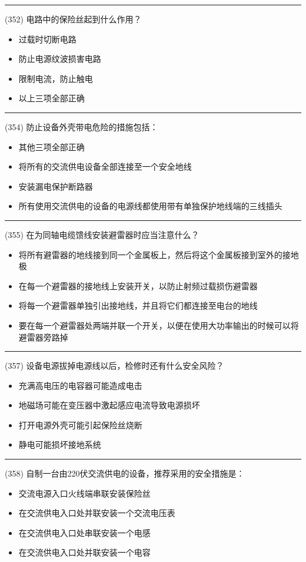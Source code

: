 \documentclass[twocolumn,hyperref,UTF8]{ctexart}  %
\begin{document}
\noindent\rule{0.5\textwidth}{1pt}
\heiti (352) 电路中的保险丝起到什么作用？ \songti {\color{gray} [LK1225] }
\begin{itemize}
	\item  过载时切断电路
	\item  防止电源纹波损害电路
	\item  限制电流，防止触电
	\item  以上三项全部正确
\end{itemize}


\noindent\rule{0.5\textwidth}{1pt}
\heiti (354) 防止设备外壳带电危险的措施包括： \songti {\color{gray} [LK1227] }
\begin{itemize}
	\item  其他三项全部正确
	\item  将所有的交流供电设备全部连接至一个安全地线
	\item  安装漏电保护断路器
	\item  所有使用交流供电的设备的电源线都使用带有单独保护地线端的三线插头
\end{itemize}


\noindent\rule{0.5\textwidth}{1pt}
\heiti (355) 在为同轴电缆馈线安装避雷器时应当注意什么？ \songti {\color{gray} [LK1228] }
\begin{itemize}
	\item  将所有避雷器的地线接到同一个金属板上，然后将这个金属板接到室外的接地极
	\item  在每一个避雷器的接地线上安装开关，以防止射频过载损伤避雷器
	\item  将每一个避雷器单独引出接地线，并且将它们都连接至电台的地线
	\item  要在每一个避雷器处两端并联一个开关，以便在使用大功率输出的时候可以将避雷器旁路掉
\end{itemize}


\noindent\rule{0.5\textwidth}{1pt}
\heiti (357) 设备电源拔掉电源线以后，检修时还有什么安全风险？ \songti {\color{gray} [LK1233] }
\begin{itemize}
	\item  充满高电压的电容器可能造成电击
	\item  地磁场可能在变压器中激起感应电流导致电源损坏
	\item  打开电源外壳可能引起保险丝烧断
	\item  静电可能损坏接地系统
\end{itemize}


\noindent\rule{0.5\textwidth}{1pt}
\heiti (358) 自制一台由220伏交流供电的设备，推荐采用的安全措施是： \songti {\color{gray} [LK1234] }
\begin{itemize}
	\item  交流电源入口火线端串联安装保险丝
	\item  在交流供电入口处并联安装一个交流电压表
	\item  在交流供电入口处串联安装一个电感
	\item  在交流供电入口处并联安装一个电容
\end{itemize}
\end{document}
